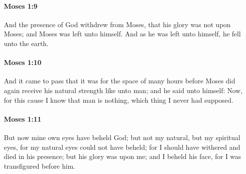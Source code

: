 		\paragraph{Moses 1:9} %
			\label{MOSES-1-9}

			And the presence of God withdrew from Moses, that his glory was not upon Moses; and Moses was left unto himself. And as he was left unto himself, he fell unto the earth.


		\paragraph{Moses 1:10} %
			\label{MOSES-1-10}

			And it came to pass that it was for the space of many hours before Moses did again receive his natural strength like unto man; and he said unto himself: Now, for this cause I know that man is nothing, which thing I never had supposed.


		\paragraph{Moses 1:11} %
			\label{MOSES-1-11}

			But now mine own eyes have beheld God; but not my natural, but my spiritual eyes, for my natural eyes could not have beheld; for I should have withered and died in his presence; but his glory was upon me; and I beheld his face, for I was transfigured before him.


